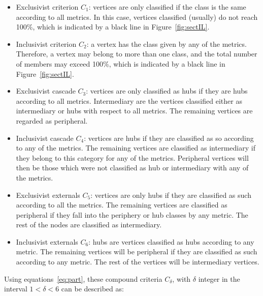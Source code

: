 \documentclass[%
	aip,
	jmp,%
	amsmath,amssymb,
	reprint,%
]{revtex4-1}
\begin{document}
\begin{itemize}
	\item Exclusivist criterion $C_1$:  vertices are only classified if the class is the same according to all metrics. In this case, vertices classified (usually) do not reach 100\%, which is indicated by a black line in Figure~\ref{fig:sectIL}.
	\item Inclusivist criterion $C_2$: a vertex has the class given by any of the metrics. Therefore, a vertex may belong to more than one class, and the total number of members may exceed 100\%, which is indicated by a black line in Figure~\ref{fig:sectIL}.
	\item Exclusivist cascade $C_3$: vertices are only classified as hubs if they are hubs according to all metrics. Intermediary are the vertices classified either as intermediary or hubs with respect to all metrics. The remaining vertices are regarded as peripheral.
	\item Inclusivist cascade $C_4$: vertices are hubs if they are classified as so according to any of the metrics. The remaining vertices are classified as intermediary if they belong to this category for any of the metrics. Peripheral vertices will then be those which were not classified as hub or intermediary with any of the metrics. 
	\item Exclusivist externals $C_5$: vertices are only hubs if they are classified as such according to all the metrics. The remaining vertices are classified as peripheral if they fall into the periphery or hub classes by any metric. The rest of the nodes are classified as intermediary.
	\item Inclusivist externals $C_6$: hubs are vertices classified as hubs according to any metric. The remaining vertices will be peripheral if they are classified as such according to any metric. The rest of the vertices will be intermediary vertices.
\end{itemize}

Using equations~\ref{eq:part}, these compound criteria $C_\delta$, with $\delta$ integer in the interval $1<\delta<6$ can be described as:
\end{document}

